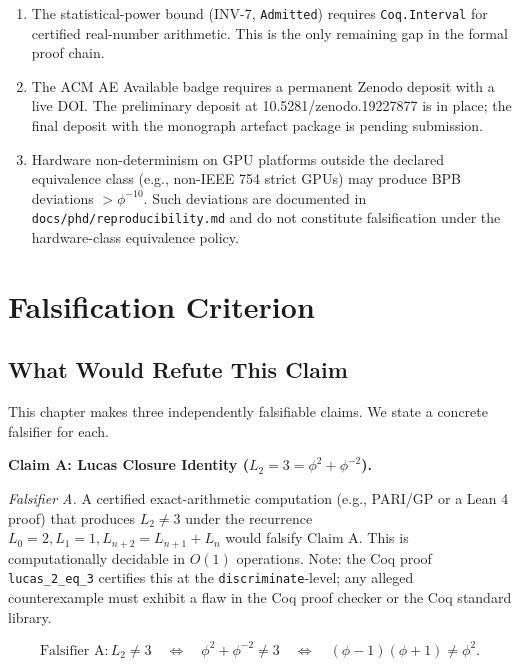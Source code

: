 \begin{enumerate}
  \item The statistical-power bound (INV-7, \texttt{Admitted}) requires
        \texttt{Coq.Interval} for certified real-number arithmetic.
        This is the only remaining gap in the formal proof chain.
  \item The ACM AE Available badge requires a permanent Zenodo deposit
        with a live DOI.  The preliminary deposit at
        10.5281/zenodo.19227877 is in place; the final deposit with
        the monograph artefact package is pending submission.
  \item Hardware non-determinism on GPU platforms outside the declared
        equivalence class (e.g., non-IEEE 754 strict GPUs) may produce
        BPB deviations $> \phi^{-10}$.  Such deviations are documented
        in \texttt{docs/phd/reproducibility.md} and do not constitute
        falsification under the hardware-class equivalence policy.
\end{enumerate}

\section{Falsification Criterion}
\label{sec:29-falsify}

\subsection{What Would Refute This Claim}

This chapter makes three independently falsifiable claims.  We state
a concrete falsifier for each.

\medskip\noindent
\textbf{Claim A: Lucas Closure Identity ($L_2 = 3 = \phi^2 + \phi^{-2}$).}

\noindent\textit{Falsifier A.}  A certified exact-arithmetic computation
(e.g., PARI/GP or a Lean 4 proof) that produces $L_2 \neq 3$ under
the recurrence $L_0 = 2, L_1 = 1, L_{n+2} = L_{n+1} + L_n$ would
falsify Claim A.  This is computationally decidable in $O(1)$
operations.  Note: the Coq proof \texttt{lucas\_2\_eq\_3} certifies
this at the \texttt{discriminate}-level; any alleged counterexample
must exhibit a flaw in the Coq proof checker or the Coq standard
library.

\begin{equation}
  \text{Falsifier A}: L_2 \neq 3
  \quad\Leftrightarrow\quad
  \phi^2 + \phi^{-2} \neq 3
  \quad\Leftrightarrow\quad
  (\phi - 1)(\phi + 1) \neq \phi^2.
  \label{eq:falsifier-a}
\end{equation}

